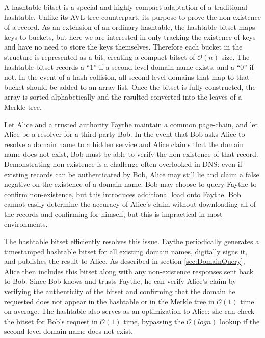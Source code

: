 A hashtable bitset is a special and highly compact adaptation of a traditional hashtable. Unlike its AVL tree counterpart, its purpose to prove the non-existence of a record. As an extension of an ordinary hashtable, the hashtable bitset maps keys to buckets, but here we are interested in only tracking the existence of keys and have no need to store the keys themselves. Therefore each bucket in the structure is represented as a bit, creating a compact bitset of $ \mathcal{O}(n) $ size. The hashtable bitset records a ``1'' if a second-level domain name exists, and a ``0'' if not. In the event of a hash collision, all second-level domains that map to that bucket should be added to an array list. Once the bitset is fully constructed, the array is sorted alphabetically and the resulted converted into the leaves of a Merkle tree.



Let Alice and a trusted authority Faythe maintain a common page-chain, and let Alice be a resolver for a third-party Bob. In the event that Bob asks Alice to resolve a domain name to a hidden service and Alice claims that the domain name does not exist, Bob must be able to verify the non-existence of that record. Demonstrating non-existence is a challenge often overlooked in DNS: even if existing records can be authenticated by Bob, Alice may still lie and claim a false negative on the existence of a domain name. Bob may choose to query Faythe to confirm non-existence, but this introduces additional load onto Faythe. Bob cannot easily determine the accuracy of Alice's claim without downloading all of the records and confirming for himself, but this is impractical in most environments.

The hashtable bitset efficiently resolves this issue. Faythe periodically generates a timestamped hashtable bitset for all existing domain names, digitally signs it, and publishes the result to Alice. As described in section \ref{sec:DomainQuery}, Alice then includes this bitset along with any non-existence responses sent back to Bob. Since Bob knows and trusts Faythe, he can verify Alice's claim by verifying the authenticity of the bitset and confirming that the domain he requested does not appear in the hashtable or in the Merkle tree in $ \mathcal{O}(1) $ time on average. The hashtable also serves as an optimization to Alice: she can check the bitset for Bob's request in $ \mathcal{O}(1) $ time, bypassing the $ \mathcal{O}(log n) $ lookup if the second-level domain name does not exist.


